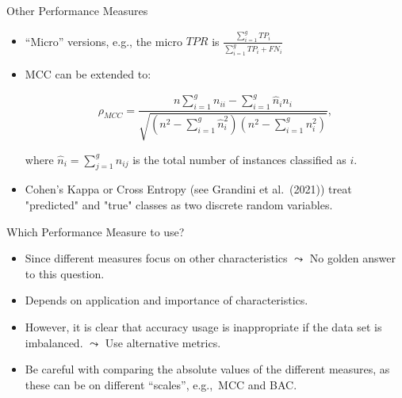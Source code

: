 \documentclass[11pt,compress,t,notes=noshow, aspectratio=169, xcolor=table]{beamer}
\begin{document}
\begin{frame}{Other Performance Measures}

	\small{

		\begin{itemize}
		
			\item ``Micro'' versions, e.g., the micro $TPR$ is $\frac{\sum_{i=1}^g TP_i}{\sum_{i=1}^g TP_i + FN_i}$ 
            \vspace{10pt}
		
			\item MCC can be extended to:
			
			$$   \rho_{MCC} = \frac{ n  \sum_{i=1}^g n_{ii} -  \sum_{i=1}^g \hat n_i n_i}{\sqrt{ (n^2 - \sum_{i=1}^g \hat n_i^2)(n^2 - \sum_{i=1}^g n_i^2)  }},$$

			where $\hat n_i = \sum_{j=1}^g n_{ij}$ is the total number of instances classified as $i.$
            \vspace{10pt}
        
		
			\item Cohen's Kappa or Cross Entropy (see Grandini et al.\ (2021)) treat "predicted" and "true" classes as two discrete random variables.
		
		\end{itemize}
	}
\end{frame}


\begin{frame}{Which Performance Measure to use?}

	\small{

		\begin{itemize}

            \item Since different measures focus on other characteristics $\leadsto$ No golden answer to this question.
	
			\item Depends on application and importance of characteristics.

			\item However, it is clear that accuracy usage is inappropriate if the data set is imbalanced. $\leadsto$ Use alternative metrics.

			\item Be careful with comparing the absolute values of the different measures, as these can be on different ``scales'', e.g.,\ MCC and BAC. 
	
		\end{itemize}
	}
\end{frame}
\end{document}
